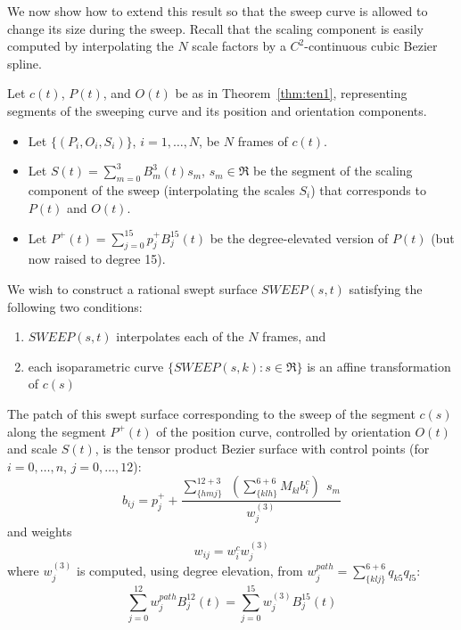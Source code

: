 We now show how to extend this result so that the sweep curve
is allowed to change its size during the sweep.
Recall that the scaling component is easily computed by interpolating the
$N$ scale factors by a $C^2$-continuous cubic Bezier spline.

\begin{theorem}
\label{thm:ten2}
Let $c(t)$, $P(t)$, and $O(t)$ be as in Theorem~\ref{thm:ten1},
representing segments of the sweeping curve and its position and orientation components.
\begin{itemize}
\item
Let $\{(P_i,O_i,S_i)\}$, $i=1,\ldots,N$, be $N$ frames of $c(t)$.
\item
Let $S(t) = \sum_{m=0}^{3} B_m^3(t) s_m$, $s_m \in \Re$
be the segment of the scaling component of the sweep (interpolating the scales
$S_i$) that corresponds to $P(t)$ and $O(t)$.
\item
Let $P^{+}(t) = \sum_{j=0}^{15} p_j^{+} B_j^{15}(t)$
be the degree-elevated version of $P(t)$ (but now raised to degree 15).
\end{itemize}

We wish to construct a rational swept surface $SWEEP(s,t)$ satisfying 
the following two conditions:
\begin{enumerate}
\item $SWEEP(s,t)$ interpolates each of the $N$ frames, and
\item  each isoparametric curve $\{SWEEP(s,k) : s \in \Re \}$
	is an affine transformation of $c(s)$
\end{enumerate}
The patch of this swept surface corresponding to the sweep of the segment
$c(s)$ along the segment $P^{+}(t)$ of the position curve, controlled 
by orientation $O(t)$ and scale $S(t)$, 
is the tensor product Bezier surface with control points
(for $i=0,\ldots,n$, $j=0,\ldots,12$):
\[
b_{ij} = p_j^{+} + \frac{\sum_{\{hmj\}}^{12+3} \ \ 
		(\sum_{\{klh\}}^{6+6} M_{kl} b_i^c) \ \ s_m}{w^{(3)}_j}
\]
and weights
\[
w_{ij} = w_i^c  w^{(3)}_j
\]
where $w^{(3)}_j$ is computed, using degree elevation, from 
$w_j^{path} = \sum_{\{klj\}}^{6+6} q_{k5} q_{l5}$:
\[ \sum_{j=0}^{12} w_j^{path} B_j^{12}(t) = 
   \sum_{j=0}^{15} w_j^{(3)}  B_j^{15}(t) \]
\end{theorem}
